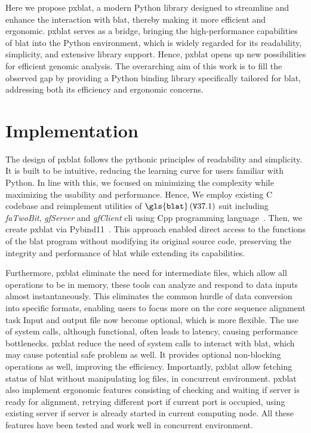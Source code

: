 Here we propose \gls{pxblat}, a modern Python library designed to streamline and enhance the interaction with \gls{blat}, thereby making it more efficient and ergonomic.
\gls{pxblat} serves as a bridge, bringing the high-performance capabilities of \gls{blat}  into the Python environment, which is widely regarded for its readability, simplicity, and extensive library support.
Hence, \gls{pxblat} opens up new possibilities for efficient genomic analysis.
The overarching aim of this work is to fill the observed gap by providing a Python binding library specifically tailored for \gls{blat}, addressing both its efficiency and ergonomic concerns.

\section*{Implementation}\label{sec:implementation}


The design of \gls{pxblat} follows the pythonic principles of readability and simplicity.
It is built to be intuitive, reducing the learning curve for users familiar with Python.
In line with this, we focused on minimizing the complexity while maximizing the usability and performance.
Hence, We employ existing C codebase and reimplement utilities of \(\mathtt{\gls{blat}}\left(\mathtt{V}37.1\right)\) suit  including \emph{faTwoBit}, \emph{gfServer} and \emph{gfClient} \gls{cli} using Cpp programming language~\citep{kent2002blat}.
Then, we create \gls{pxblat} via Pybind11~\citep{pybind11}.
This approach enabled direct access to the functions of the \gls{blat} program without modifying its original source code, preserving the integrity and performance of \gls{blat} while extending its capabilities.

Furthermore, \gls{pxblat} eliminate the need for intermediate files, which allow all operations to be in memory, these tools can analyze and respond to data inputs almost instantaneously.
This eliminates the common hurdle of data conversion into specific formats, enabling users to focus more on the core sequence alignment task
Input and output file now become optional, which is more flexible.
The use of system calls, although functional, often leads to latency, causing performance bottlenecks.
\gls{pxblat} reduce the need of system calls to interact with \gls{blat}, which may cause potential safe problem as well.
It provides optional non-blocking operations as well, improving the efficiency.
Importantly, \gls{pxblat} allow fetching status of \gls{blat} without manipulating log files, in concurrent environment.
\gls{pxblat} also implement ergonomic features consisting of checking and waiting if server is ready for alignment, retrying different port if current port is occupied, using existing server if server is already started in current computing node.
All these features have been tested and work well in concurrent environment.

